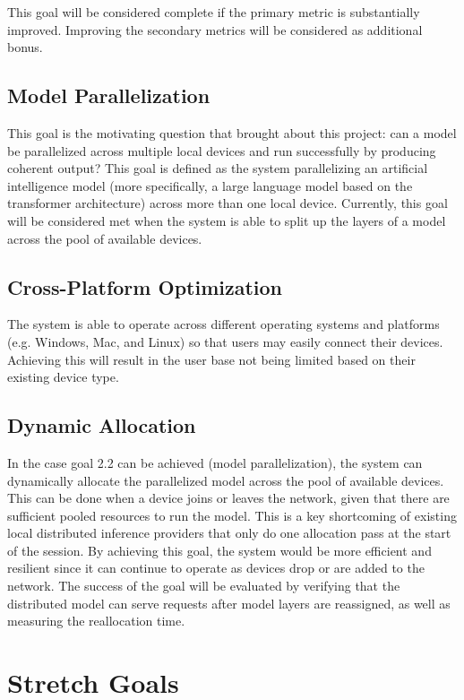 \documentclass{article}
\begin{document}
\vspace{3mm}

This goal will be considered complete if the primary metric is substantially improved. Improving the
secondary metrics will be considered as additional bonus.

\subsection{Model Parallelization}
This goal is the motivating question that brought about this project: can a model be parallelized across multiple local devices and run successfully by producing coherent output? This goal is defined as the system parallelizing an artificial intelligence model (more specifically, a large language model based on the transformer architecture) across more than one local device. Currently, this goal will be considered met when the system is able to split up the layers of a model across the pool of available devices.
    
\subsection{Cross-Platform Optimization}
The system is able to operate across different operating systems and platforms (e.g. Windows, Mac, and Linux) so that users may easily connect their devices. Achieving this will result in the user base not being limited based on their existing device type.

\subsection{Dynamic Allocation}
In the case goal 2.2 can be achieved (model parallelization), the system can dynamically allocate the parallelized model across the pool of available devices. This can be done when a device joins or leaves the network, given that there are sufficient pooled resources to run the model. This is a key shortcoming of existing local distributed inference providers that only do one allocation pass at the start of the session. By achieving this goal, the system would be more efficient and resilient since it can continue to operate as devices drop or are added to the network. The success of the goal will be evaluated by verifying that the distributed model can serve requests after model layers are reassigned, as well as measuring the reallocation time.

\section{Stretch Goals}
\end{document}
